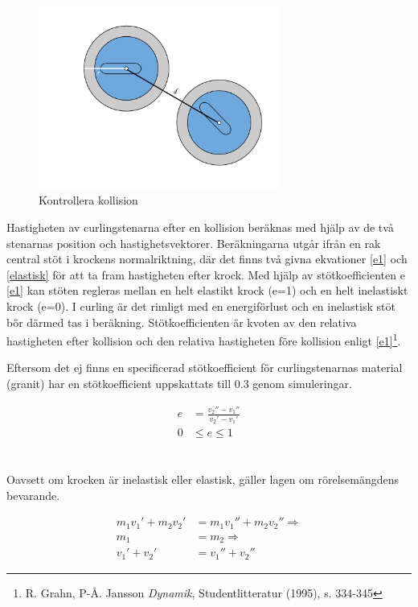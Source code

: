 \documentclass[11pt]{article} %
\begin{document}
\begin{figure}[ht!]
\centering
\includegraphics[width=80mm]{krock.png}
\caption{Kontrollera kollision}
\label{fig:kollision}
\label{overflow}
\end{figure}
Hastigheten av curlingstenarna efter en kollision beräknas med hjälp av de två stenarnas position och hastighetsvektorer.
Beräkningarna utgår ifrån en rak central stöt i krockens normalriktning, där det finns två givna ekvationer \eqref{e1} och \eqref{elastisk} för att ta fram hastigheten efter krock. 
Med hjälp av stötkoefficienten e \eqref{e1} kan stöten regleras mellan en helt elastikt krock (e=1) och en helt inelastiskt krock (e=0). 
I curling är det rimligt med en energiförlust och en inelastisk stöt bör därmed tas i beräkning. 
Stötkoefficienten är kvoten av den relativa hastigheten efter kollision och den relativa hastigheten före kollision enligt \eqref{e1}\footnote{R. Grahn, P-Å. Jansson \emph{Dynamik}, Studentlitteratur (1995), s. 334-345}.

Eftersom det ej finns en specificerad stötkoefficient för curlingstenarnas material (granit) har en stötkoefficient uppskattats till 0.3 genom simuleringar.  

 \begin{subequations}\label{e1}
 \begin{align}
 e& = \frac{v_2''-v_1''}{v_2'-v_1'}\\
0& \le e \le 1
 \end{align}
 \end{subequations}
\\\\Oavsett om krocken är inelastisk eller elastisk, gäller lagen om rörelsemängdens bevarande.

 \begin{subequations}\label{elastisk}
 \begin{align}
m_1 v_1' + m_2 v_2'& = m_1 v_1'' + m_2 v_2'' \Rightarrow\\
m_1& = m_2 \Rightarrow\\
v_1' + v_2'& = v_1'' + v_2'' \label{momentum}
 \end{align}
 \end{subequations}
\end{document}
